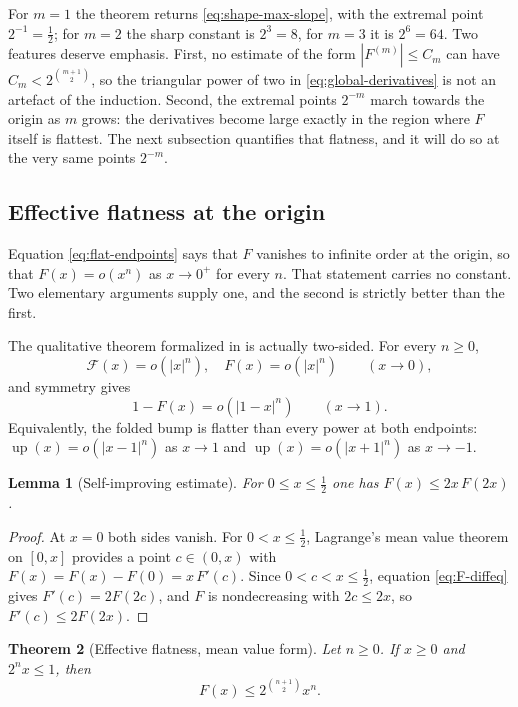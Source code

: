 \documentclass[11pt,oneside]{article}
\newtheorem{theorem}{Theorem}[section]
\newtheorem{lemma}[theorem]{Lemma}
\theoremstyle{definition}
\theoremstyle{remark}
\newcommand{\Up}{\operatorname{up}}
\newcommand{\smallo}{o}
\begin{document}
For $m=1$ the theorem returns \eqref{eq:shape-max-slope}, with the extremal point
$2^{-1}=\tfrac12$; for $m=2$ the sharp constant is $2^{3}=8$, for $m=3$ it is $2^{6}=64$.
Two features deserve emphasis.  First, no estimate of the form $|F^{(m)}|\le C_m$ can have
$C_m<2^{\binom{m+1}{2}}$, so the triangular power of two in \eqref{eq:global-derivatives} is
not an artefact of the induction.  Second, the extremal points $2^{-m}$ march towards the
origin as $m$ grows: the derivatives become large exactly in the region where $F$ itself is
flattest.  The next subsection quantifies that flatness, and it will do so at the very same
points $2^{-m}$.

\subsection{Effective flatness at the origin}
\label{shape:effective-flatness}

Equation \eqref{eq:flat-endpoints} says that $F$ vanishes to infinite order at the origin, so
that $F(x)=\smallo(x^n)$ as $x\to0^{+}$ for every $n$.  That statement carries no constant.
Two elementary arguments supply one, and the second is strictly better than the first.

The qualitative theorem formalized in  is actually two-sided.  For
every $n\ge0$,
\[
 \mathcal F(x)=\smallo(|x|^n),\quad F(x)=\smallo(|x|^n)\qquad(x\to0),
\]
and symmetry gives
\[
 1-F(x)=\smallo(|1-x|^n)\qquad(x\to1).
\]
Equivalently, the folded bump is flatter than every power at both endpoints:
$\Up(x)=\smallo(|x-1|^n)$ as $x\to1$ and
$\Up(x)=\smallo(|x+1|^n)$ as $x\to-1$.

\begin{lemma}[Self-improving estimate]
\label{thm:shape-selfimproving}
For $0\le x\le\tfrac12$ one has $F(x)\le2x\,F(2x)$.
\end{lemma}

\begin{proof}
At $x=0$ both sides vanish.  For $0<x\le\tfrac12$, Lagrange's mean value theorem on $[0,x]$
provides a point $c\in(0,x)$ with $F(x)=F(x)-F(0)=x\,F'(c)$.  Since $0<c<x\le\tfrac12$,
equation \eqref{eq:F-diffeq} gives $F'(c)=2F(2c)$, and $F$ is nondecreasing with $2c\le2x$,
so $F'(c)\le2F(2x)$.
\end{proof}

\begin{theorem}[Effective flatness, mean value form]
\label{thm:shape-flatness-mvt}
Let $n\ge0$.  If $x\ge0$ and $2^nx\le1$, then
\begin{equation}
 F(x)\le2^{\binom{n+1}{2}}x^{n}.                          \label{eq:shape-flatness-mvt}
\end{equation}
\end{theorem}
\end{document}

